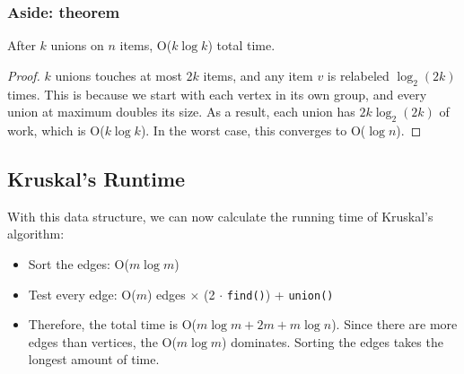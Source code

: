 \documentclass[10pt]{article}
\begin{document}
\subsubsection*{Aside: theorem}
After $k$ unions on $n$ items, O($k \log k$) total time.\\
\begin{proof}
    $k$ unions touches at most $2k$ items, and any item $v$ is relabeled $\log_2(2k)$ times.  This is because we start with each vertex in its own group, and every union at maximum doubles its size.  As a result, each union has $2k \log_2(2k)$ of work, which is O($k \log k$).  In the worst case, this converges to O($\log n$).
\end{proof}
\subsection*{Kruskal's Runtime}
With this data structure, we can now calculate the running time of Kruskal's algorithm:
\begin{itemize}
    \item Sort the edges: O($m \log m$)
    \item Test every edge: O($m$) edges $\times$ (2 $\cdot$ \texttt{find()}) + \texttt{union()}
    \item Therefore, the total time is O($m \log m + 2m + m \log n$).  Since there are more edges than vertices, the O($m \log m$) dominates.  Sorting the edges takes the longest amount of time.
\end{itemize}
\end{document}
